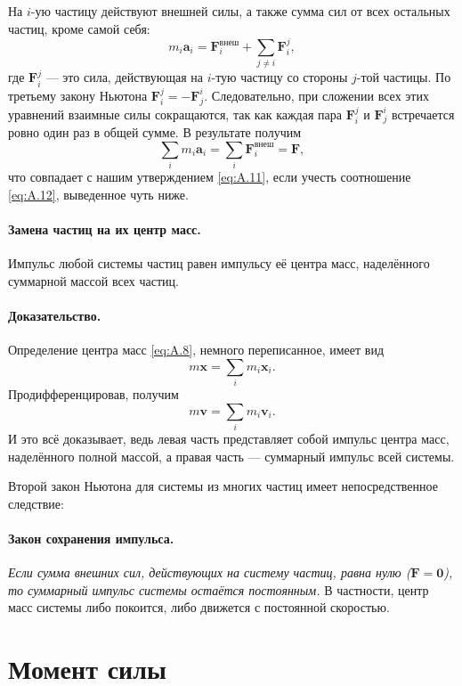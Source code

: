 На $i$-ую частицу действуют внешней силы, а также сумма сил от всех остальных частиц, кроме самой себя:
\[m_i \mathbf{a}_i = \mathbf{F}_i^{\text{внеш}} + \sum_{j \neq i} \mathbf{F}_{i}^{j},\]
где $\mathbf{F}_{i}^{j}$ — это сила, действующая на $i$-тую частицу
со стороны $j$-той частицы.
По третьему закону Ньютона $\mathbf{F}_{i}^{j} = -\mathbf{F}_{j}^{i}$.
Следовательно, при сложении всех этих уравнений взаимные силы
сокращаются, так как каждая пара $\mathbf{F}_{i}^{j}$ и $\mathbf{F}_{j}^{i}$
встречается ровно один раз в общей сумме.
В результате получим
\[
\sum_i m_i \mathbf{a}_i = \sum_i \mathbf{F}_i^{\text{внеш}} = \mathbf{F},
\]
что совпадает с нашим утверждением \eqref{eq:A.11}, если учесть соотношение \eqref{eq:A.12}, выведенное чуть ниже.

\paragraph{Замена частиц на их центр масс.}
Импульс любой системы частиц равен импульсу её центра масс, наделённого суммарной массой всех частиц.

\paragraph{Доказательство.}
Определение центра масс \eqref{eq:A.8}, немного
переписанное, имеет вид
\begin{equation}
    m \mathbf{x} = \sum_i m_i \mathbf{x}_i.
    \label{eq:A.12}
\end{equation}
Продифференцировав, получим
\[m \mathbf{v} = \sum_i m_i \mathbf{v}_i.\]
И это всё доказывает, ведь левая часть представляет собой импульс центра масс, наделённого полной массой,
а правая часть — суммарный импульс всей системы.

Второй закон Ньютона для системы из многих частиц имеет непосредственное следствие:

\paragraph{Закон сохранения импульса.} \emph{Если сумма внешних сил, действующих на систему частиц, равна нулю ($\mathbf{F} = \mathbf{0}$), то суммарный импульс системы остаётся постоянным.}
В частности, центр масс системы либо покоится, либо движется с постоянной скоростью.
\label{Импульс:end}

\section{Момент силы}\label{sec:A.5}

